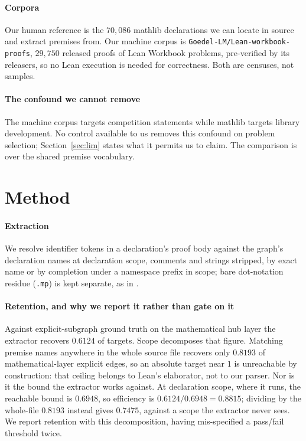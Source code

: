 \documentclass{article}
\begin{document}
\paragraph{Corpora}
Our human reference is the $70{,}086$ mathlib declarations we can locate in
source and extract premises from. Our machine corpus is
\texttt{Goedel-LM/Lean-workbook-proofs}, $29{,}750$ released proofs of Lean
Workbook problems, pre-verified by its releasers, so no Lean execution is needed
for correctness. Both are censuses, not samples.

\paragraph{The confound we cannot remove}
The machine corpus targets competition statements while mathlib targets library
development. No control available to us removes this confound on problem
selection; Section~\ref{sec:lim} states what it permits us to claim. The
comparison is over the shared premise vocabulary.

\section{Method}\label{mth}

\paragraph{Extraction}
We resolve identifier tokens in a declaration's proof body against the graph's
declaration names at declaration scope, comments and strings stripped, by exact
name or by completion under a namespace prefix in scope; bare dot-notation
residue (\texttt{.mp}) is kept separate, as in \citet{cslibpremise}.

\paragraph{Retention, and why we report it rather than gate on it}
Against explicit-subgraph ground truth on the mathematical hub layer the
extractor recovers $0.6124$ of targets. Scope decomposes that figure. Matching premise
names anywhere in the whole source file recovers only $0.8193$ of
mathematical-layer explicit edges, so an absolute target near $1$ is unreachable
by construction: that ceiling belongs to Lean's elaborator, not to our parser.
Nor is it the bound the extractor works against. At declaration scope, where it
runs, the reachable bound is $0.6948$, so efficiency is
$0.6124/0.6948 = \mathbf{0.8815}$; dividing by the whole-file $0.8193$ instead
gives $0.7475$, against a scope the extractor never sees. We report retention
with this decomposition, having mis-specified a pass/fail threshold twice.
\end{document}
